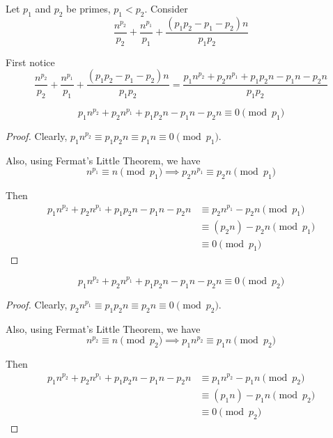 
Let $p_1$ and $p_2$ be primes, $p_1 < p_2$. Consider
\[ \frac{n^{p_2}}{p_2} + \frac{n^{p_1}}{p_1} + \frac{(p_1 p_2 - p_1 - p_2)n}{p_1 p_2} \]

First notice
\[ 
\frac{n^{p_2}}{p_2} + \frac{n^{p_1}}{p_1} + \frac{(p_1 p_2 - p_1 -p_2)n}{p_1 p_2} 
= 
\frac {p_1 n^{p_2} + p_2 n^{p_1} + p_1 p_2 n - p_1 n - p_2 n}{p_1 p_2}
\]

\begin{lemma}
    \[p_1 n^{p_2} + p_2 n^{p_1} + p_1 p_2 n - p_1 n - p_2 n \equiv 0 \pmod{p_1} \]
\end{lemma}
\begin{proof}
    Clearly, $p_1 n^{p_2} \equiv p_1 p_2 n \equiv p_1 n \equiv0 \pmod{p_1}$.
    
    Also, using Fermat's Little Theorem, we have
    \[ n^{p_1} \equiv n \pmod{p_1} \implies  p_2 n^{p_1} \equiv p_2 n \pmod{p_1} \]
    
    Then
    \begin{align*}
    p_1 n^{p_2} + p_2 n^{p_1} + p_1 p_2 n - p_1 n - p_2 n
    &\equiv p_2 n^{p_1} - p_2 n \pmod{p_1}\\
    &\equiv (p_2 n) - p_2 n \pmod{p_1}\\
    &\equiv 0 \pmod{p_1}
    \end{align*}
\end{proof}


\begin{lemma}
    \[p_1 n^{p_2} + p_2 n^{p_1} + p_1 p_2 n - p_1 n - p_2 n \equiv 0 \pmod{p_2} \]
\end{lemma}
\begin{proof}
    Clearly, $p_2 n^{p_1} \equiv p_1 p_2 n \equiv p_2 n \equiv0 \pmod{p_2}$.

    Also, using Fermat's Little Theorem, we have
    \[ n^{p_2} \equiv n \pmod{p_2} \implies  p_1 n^{p_2} \equiv p_1 n  \pmod{p_2} \]
    
    Then
    \begin{align*}
    p_1 n^{p_2} + p_2 n^{p_1} + p_1 p_2 n - p_1 n - p_2 n
    &\equiv p_1 n^{p_2} - p_1 n \pmod{p_2}\\
    &\equiv (p_1 n) - p_1 n \pmod{p_2}\\
    &\equiv 0 \pmod{p_2}
    \end{align*}
\end{proof}


